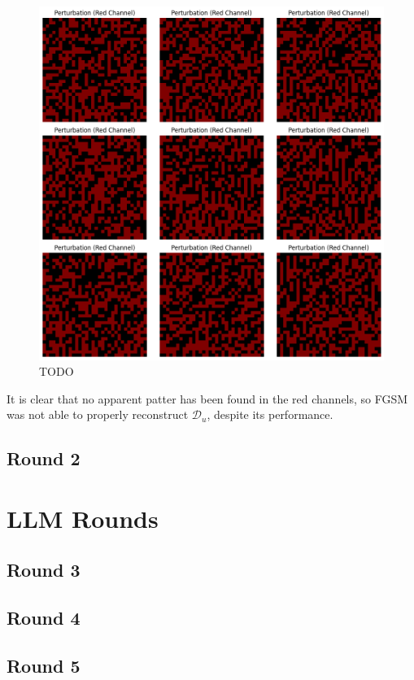 \documentclass[letterpaper]{article} %
\begin{document}
\begin{figure}[h!]
\centering
\includegraphics[width=\columnwidth]{figures/round_1_FGSM_reverse_eng_red.png}
\caption{TODO}
\end{figure}

It is clear that no apparent patter has been found in the red channels, so FGSM was not able to properly reconstruct $\mathcal{D}_u$, despite its performance.


\subsection{Round 2}

\section{LLM Rounds}

\subsection{Round 3}
\subsection{Round 4}
\subsection{Round 5}
\end{document}
